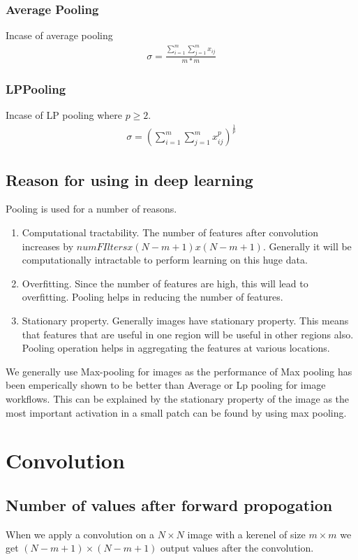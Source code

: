 \documentclass{article}
\begin{document}
\subsubsection{Average Pooling}
Incase of average pooling
\begin{align*}
  \sigma = \frac{\sum_{i=1}^{m} \sum_{j=1}^{m} x_{ij}}{m*m}
\end{align*}

\subsubsection{LPPooling}
Incase of LP pooling where $p \ge 2$.
\begin{align*}
  \sigma = {(\sum_{i=1}^{m}\sum_{j=1}^{m} x_{ij}^{p} )}^{\frac{1}{p}}
\end{align*}

\subsection{Reason for using in deep learning}
Pooling is used for a number of reasons.
\begin{enumerate}
  \item Computational tractability.  The number of features after convolution increases by $numFIlters x (N-m+1) x (N-m+1)$.  Generally it will be computationally intractable to perform learning on this huge data.
  \item Overfitting.  Since the number of features are high, this will lead to overfitting.  Pooling helps in reducing the number of features.
  \item Stationary property.  Generally images have stationary property.  This means that features that are useful in one region will be useful in other regions also.  Pooling operation helps in aggregating the features at various locations.
\end{enumerate}

We generally use Max-pooling for images as the performance of Max pooling has been emperically shown to be better than Average or Lp pooling for image workflows.  This can be explained by the stationary property of the image as the most important activation in a small patch can be found by using max pooling.

\section{Convolution}
\subsection{Number of values after forward propogation}
When we apply a convolution on a $N \times N$ image with a kerenel of size $ m \times m $ we get $(N-m+1) \times (N-m+1)$ output values after the convolution.
\end{document}
